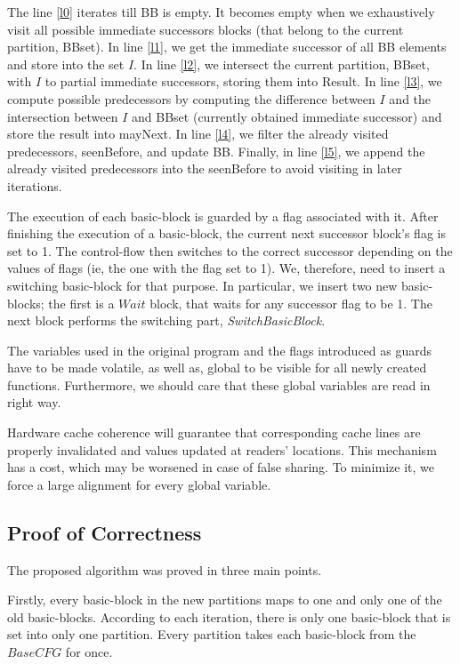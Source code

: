 \documentclass[3p,times,procedia,twocolumn,letterpaper]{elsarticle}
\begin{document}
The line \ref{l0} iterates till  BB is empty. It becomes empty when we exhaustively visit all possible immediate successors blocks (that belong to the current partition, BBset). In line \ref{l1}, we get the immediate successor of all BB elements and store into the set $I$. In line \ref{l2}, we intersect the current partition, BBset, with $I$ to partial immediate successors, storing them into Result. In line \ref{l3}, we compute possible predecessors by computing the difference between $I$ and the intersection between $I$ and BBset (currently obtained immediate successor) and store the result into mayNext. In line \ref{l4}, we filter the already visited predecessors, seenBefore, and update BB. Finally, in line \ref{l5}, we append the already visited predecessors into the seenBefore to avoid visiting in later iterations.

The execution of each basic-block is guarded by a flag associated with it. After finishing the execution of a basic-block, the current next successor block's flag is set to 1. The control-flow then switches to the correct successor depending on the values of flags (ie, the one with the flag set to 1). We, therefore, need to insert a switching basic-block for that purpose. In particular, we insert two new basic-blocks; the first is a $Wait$ block, that waits for any successor flag to be 1. The next block performs the switching part, \emph{SwitchBasicBlock}.

The variables used in the original program and the flags introduced as guards have to be made volatile, as well as, global to be visible for all newly created functions. Furthermore, we should care that these global variables are read in right way.

Hardware cache coherence will guarantee that corresponding cache lines are properly invalidated and values updated at readers' locations. This mechanism has a cost, which may be worsened in case of false sharing. 
 To minimize it, we force a large alignment for every global variable.




\subsection{Proof of Correctness}

The proposed algorithm was proved in three main points.

Firstly, every basic-block in the new partitions maps to one and only one of the old basic-blocks. According to each iteration, there is only one basic-block that is set into only one partition. Every partition takes each basic-block from the $BaseCFG$ for once.
\end{document}
